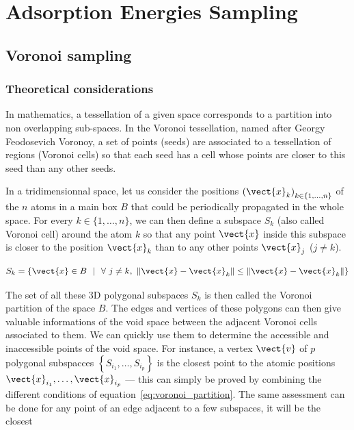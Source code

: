 \documentclass[main]{subfiles}
\begin{document}
\chapter{Adsorption Energies Sampling}
\vspace*{-1\baselineskip}

\section{Voronoi sampling}

\subsection{Theoretical considerations}

In mathematics, a tessellation of a given space corresponds to a partition into non overlapping sub-spaces. In the Voronoi tessellation, named after Georgy Feodosevich Voronoy, a set of points (seeds) are associated to a tessellation of regions (Voronoi cells) so that each seed has a cell whose points are closer to this seed than any other seeds.\cite{Rycroft_2009}

In a tridimensionnal space, let us consider the positions ${(\vect{x}_k)}_{k\in\{1,\ldots,n\}}$ of the $n$ atoms in a main box $B$ that could be periodically propagated in the whole space. For every $k\in\{1,\ldots,n\}$, we can then define a subspace $S_{k}$ (also called Voronoi cell) around the atom $k$ so that any point $\vect{x}$ inside this subspace is closer to the position $\vect{x}_k$ than to any other points $\vect{x}_j$ ($j\neq k$). 

\begin{equation}\label{eq:voronoi_partition}
  S_{k} = \left\{\vect{x} \in B\ \ |\ \ \forall\ j\neq k,\ \lVert \vect{x}-\vect{x}_k \rVert \leq \lVert \vect{x}-\vect{x}_k \rVert \right\}
\end{equation}

The set of all these 3D polygonal subspaces $S_{k}$ is then called the Voronoi partition of the space $B$. The edges and vertices of these polygons can then give valuable informations of the void space between the adjacent Voronoi cells associated to them. We can quickly use them to determine the accessible and inaccessible points of the void space. For instance, a vertex $\vect{v}$ of $p$ polygonal subspacces $\left\{S_{i_1},\ldots,S_{i_p}\right\}$ is the closest point to the atomic positions $\vect{x}_{i_1},\ldots,\vect{x}_{i_p}$ --- this can simply be proved by combining the different conditions of equation~\ref{eq:voronoi_partition}. The same assessment can be done for any point of an edge adjacent to a few subspaces, it will be the closest 
\end{document}
